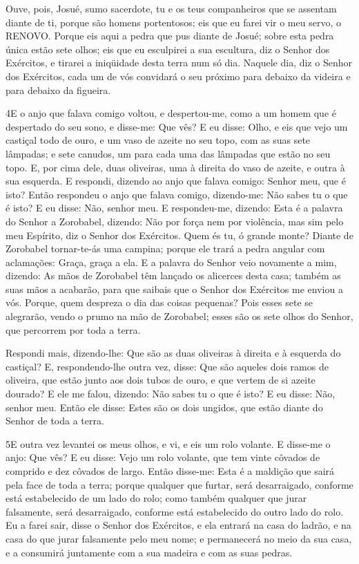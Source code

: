 Ouve, pois, Josué, sumo sacerdote, tu e os teus companheiros que
se assentam diante de ti, porque são homens portentosos; eis que eu
farei vir o meu servo, o RENOVO. Porque eis aqui a pedra que pus
diante de Josué; sobre esta pedra única estão sete olhos; eis que eu
esculpirei a sua escultura, diz o Senhor dos Exércitos, e tirarei a
iniqüidade desta terra num só dia. Naquele dia, diz o Senhor
dos Exércitos, cada um de vós convidará o seu próximo para debaixo
da videira e para debaixo da figueira.

\medskip

\lettrine{4} E o anjo que falava comigo voltou, e
despertou-me, como a um homem que é despertado do seu sono, e
disse-me: Que vês? E eu disse: Olho, e eis que vejo um castiçal todo
de ouro, e um vaso de azeite no seu topo, com as suas sete lâmpadas;
e sete canudos, um para cada uma das lâmpadas que estão no seu topo.
E, por cima dele, duas oliveiras, uma à direita do vaso de
azeite, e outra à sua esquerda. E respondi, dizendo ao anjo que
falava comigo: Senhor meu, que é isto? Então respondeu o anjo
que falava comigo, dizendo-me: Não sabes tu o que é isto? E eu
disse: Não, senhor meu. E respondeu-me, dizendo: Esta é a
palavra do Senhor a Zorobabel, dizendo: Não por força nem por
violência, mas sim pelo meu Espírito, diz o Senhor dos Exércitos.
Quem és tu, ó grande monte? Diante de Zorobabel tornar-te-ás uma
campina; porque ele trará a pedra angular com aclamações: Graça,
graça a ela. E a palavra do Senhor veio novamente a mim,
dizendo: As mãos de Zorobabel têm lançado os alicerces desta
casa; também as suas mãos a acabarão, para que saibais que o Senhor
dos Exércitos me enviou a vós. Porque, quem despreza o dia
das coisas pequenas? Pois esses sete se alegrarão, vendo o prumo na
mão de Zorobabel; esses são os sete olhos do Senhor, que percorrem
por toda a terra.

Respondi mais, dizendo-lhe: Que são as duas oliveiras à direita e
à esquerda do castiçal? E, respondendo-lhe outra vez, disse:
Que são aqueles dois ramos de oliveira, que estão junto aos dois
tubos de ouro, e que vertem de si azeite dourado? E ele me
falou, dizendo: Não sabes tu o que é isto? E eu disse: Não, senhor
meu. Então ele disse: Estes são os dois ungidos, que estão
diante do Senhor de toda a terra.

\medskip

\lettrine{5} E outra vez levantei os meus olhos, e vi, e eis
um rolo volante. E disse-me o anjo: Que vês? E eu disse: Vejo um
rolo volante, que tem vinte côvados de comprido e dez côvados de
largo. Então disse-me: Esta é a maldição que sairá pela face de
toda a terra; porque qualquer que furtar, será desarraigado,
conforme está estabelecido de um lado do rolo; como também qualquer
que jurar falsamente, será desarraigado, conforme está estabelecido
do outro lado do rolo. Eu a farei sair, disse o Senhor dos
Exércitos, e ela entrará na casa do ladrão, e na casa do que jurar
falsamente pelo meu nome; e permanecerá no meio da sua casa, e a
consumirá juntamente com a sua madeira e com as suas pedras.

